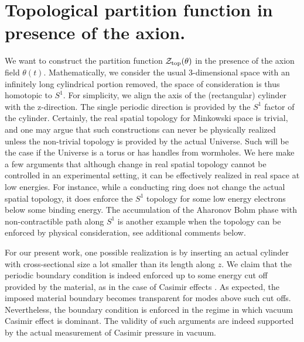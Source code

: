 \documentclass[ twocolumn,aps,prd,   
               preprintnumbers,numbers,sort&compress,nofootinbib,
                            showpacs,superscriptaddress,
               colorlinks,
               linkcolor=blue,   
               citecolor=blue]{revtex4-1}   \newcommand{\exclude}[1]{}
\begin{document}
  
   
       
  
\section{Topological partition function in presence of the axion.}\label{Z_axion}
We want to construct the partition function  ${\cal{Z}}_{\rm top} (\theta)$ in the presence of the axion field $\theta (t)$. Mathematically, we consider the usual 3-dimensional space with an infinitely long cylindrical portion removed, the space of consideration is thus homotopic to $S^1$. For simplicity, we align the axis of the (rectangular) cylinder with the z-direction. The single periodic direction is provided by the $S^1$ factor of the cylinder. Certainly, the real spatial topology for Minkowski space is trivial, and one may argue that such constructions can never be physically realized unless the non-trivial topology is provided by the actual Universe. Such will be the case if the Universe is a torus or has handles from wormholes. We here make a few arguments that although change in real spatial topology cannot be controlled in an experimental setting, it can be effectively realized in real space at low energies. For instance, while a conducting ring does not change the actual spatial topology, it does enforce the $S^1$ topology for some low energy electrons below some binding energy. 
The accumulation of the Aharonov Bohm phase with  non-contractible path along $S^1$ is another example when the topology can be enforced by physical consideration, see additional  comments below. 

For our present work, one possible realization is by inserting an actual cylinder with cross-sectional size a lot smaller than its length along $z$. We claim that the periodic boundary condition is indeed enforced up to some energy cut off provided by the material, as in the case of Casimir effects \cite{Bordag:2009zzd}. As expected, the imposed material boundary becomes transparent for modes above such cut offs. Nevertheless, the boundary condition is enforced in the regime in which vacuum Casimir effect is dominant. The validity of such arguments are indeed supported by the actual measurement of Casimir pressure in vacuum. 
\end{document}
